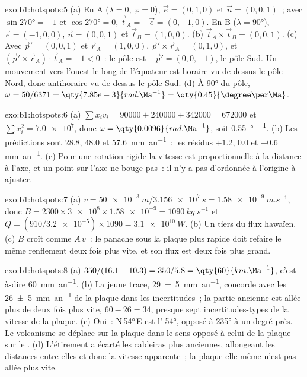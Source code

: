 \begin{solution}{exo:b1:hotspots:5}
(a) En A ($\lambda = 0$, $\varphi = 0$), $\vec e = (0, 1, 0)$ et
$\vec n = (0, 0, 1)$~; avec $\sin\ang{270} = -1$ et $\cos\ang{270} = 0$,
$\vec t_A = -\vec e = (0, -1, 0)$. En B ($\lambda = \ang{90}$),
$\vec e = (-1, 0, 0)$, $\vec n = (0, 0, 1)$ et $\vec t_B = (1, 0, 0)$.
(b) $\vec t_A\times\vec t_B = (0, 0, 1)$. (c) Avec $\vec p' = (0, 0, 1)$ et
$\vec r_A = (1, 0, 0)$, $\vec p'\times\vec r_A = (0, 1, 0)$, et
$(\vec p'\times\vec r_A)\cdot\vec t_A = -1 < 0$~: le pôle est
$-\vec p' = (0, 0, -1)$, le pôle Sud. Un mouvement vers l'ouest le long de l'équateur
est horaire vu de dessus le pôle Nord, donc antihoraire vu de dessus
le pôle Sud. (d) À \ang{90} du pôle, $\omega = 50/6371 =
\qty{7.85e-3}{rad.\Ma^{-1}} = \qty{0.45}{\degree\per\Ma}$.
\end{solution}

\begin{solution}{exo:b1:hotspots:6}
(a) $\sum x_i v_i = 90000 + 240000 + 342000 = \num{672000}$ et
$\sum x_i^2 = \num{7.0e7}$, donc $\omega = \qty{0.0096}{rad.\Ma^{-1}}$, soit
\qty{0.55}{\degree\per\Ma}. (b) Les prédictions sont 28.8, 48.0 et
\qty{57.6}{mm.an^{-1}}~; les résidus $+1.2$, $0.0$ et $-0.6$
\unit{mm.an^{-1}}. (c) Pour une rotation rigide la vitesse est proportionnelle à la
distance à l'axe, et un point sur l'axe ne bouge pas~: il n'y a pas
d'ordonnée à l'origine à ajuster.
\end{solution}

\begin{solution}{exo:b1:hotspots:7}
(a) $v = \qty{50e-3}{m}/\qty{3.156e7}{s} = \qty{1.58e-9}{m.s^{-1}}$, donc
$B = 2300\times\num{3e8}\times\num{1.58e-9} = \qty{1090}{kg.s^{-1}}$ et
$Q = (910/\num{3.2e-5})\times1090 = \qty{3.1e10}{W}$. (b) Un tiers du
flux hawaïen. (c) $B$ croît comme $A\,v$~: le panache sous la plaque plus rapide
doit refaire le même renflement deux fois plus vite, et son flux est deux fois plus grand.
\end{solution}

\begin{solution}{exo:b1:hotspots:8}
(a) $350/(16.1 - 10.3) = 350/5.8 = \qty{60}{km.\Ma^{-1}}$, c'est-à-dire
\qty{60}{mm.an^{-1}}. (b) La jeune trace, \qty{29 \pm 5}{mm.an^{-1}}, concorde
avec les \qty{26 \pm 5}{mm.an^{-1}} de la plaque dans les incertitudes~; la
partie ancienne est allée plus de deux fois plus vite, $60 - 26 = 34$, presque sept incertitudes-types
de la vitesse de la plaque. (c) Oui~: N\,\ang{54}\,E est l'
\ang{54}, opposé à \ang{235} à un degré près. Le volcanisme se déplace sur la
plaque dans le sens opposé à celui de la plaque sur le . (d) L'étirement a écarté
les caldeiras plus anciennes, allongeant les distances entre elles et donc la vitesse
apparente~; la plaque elle-même n'est pas allée plus vite.
\end{solution}

